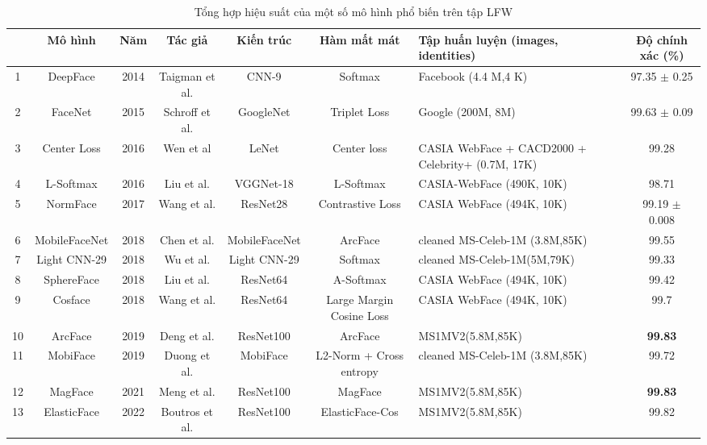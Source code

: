 \begin{table}
    \footnotesize
    \centering
    \begin{tabular}{|c|c|c|c|c|c|p{4cm}|c|}
        \hline &\textbf{Mô hình} & \textbf{Năm} & \textbf{Tác giả} & \textbf{Kiến trúc} & \textbf{Hàm mất mát} & \textbf{Tập huấn luyện (images, identities)} & \textbf{Độ chính xác (\%)} \\
        \hline 
        1&DeepFace & 2014 & Taigman et al.\cite{deep_face_Taigman_2014_CVPR}& CNN-9& Softmax & Facebook (4.4 M,4 K) & 97.35 $\pm$ 0.25 \\ 
        2&FaceNet & 2015 & Schroff et al.\cite{39_Schroff_2015_CVPR} & GoogleNet & Triplet Loss & Google (200M, 8M)& 99.63 $\pm$ 0.09\\ 
        3&Center Loss& 2016 & Wen et al\cite{LOSS_Center_10.1007/978-3-319-46478-7_31}& LeNet & Center loss & CASIA WebFace\cite{yi_2014_learning} + CACD2000\cite{chen14cross} + Celebrity+\cite{liu_2015_deep} (0.7M, 17K) & 99.28\\ 
        4&L-Softmax & 2016 & Liu et al.\cite{LOSS_L_liu_2017_largemargin}& VGGNet-18 & L-Softmax& CASIA-WebFace (490K, 10K) &98.71\\ 
        5&NormFace & 2017 & Wang et al.\cite{LOSS_Norm_10.1145/3123266.3123359}& ResNet28 & Contrastive Loss & CASIA WebFace (494K, 10K) & 99.19 $\pm$ 0.008\\ 
        6&MobileFaceNet & 2018 & Chen et al. \cite{16_chen_2018_mobilefacenets} & MobileFaceNet &ArcFace & cleaned MS-Celeb-1M\cite{guo_2016_msceleb1m} (3.8M,85K)\cite{4_Deng_2019_CVPR} & 99.55\\ 
        7&Light CNN-29 &2018 &Wu et al.\cite{40_8353856}&Light CNN-29 & Softmax & cleaned MS-Celeb-1M(5M,79K) & 99.33\\ 
        8&SphereFace & 2018 &Liu et al.\cite{10_Liu_2017_CVPR}& ResNet64 & A-Softmax & CASIA WebFace (494K, 10K)& 99.42\\ 
        9&Cosface & 2018 & Wang et al.\cite{6_Wang_2018_CVPR} & ResNet64 & Large Margin Cosine Loss & CASIA WebFace (494K, 10K)& 99.7\\ 
        10&ArcFace & 2019 & Deng et al.\cite{4_Deng_2019_CVPR} &ResNet100 & ArcFace & MS1MV2(5.8M,85K) & \textbf{99.83}\\ 
        11 & MobiFace & 2019 & Duong et al.\cite{ARC_9185981} & MobiFace & L2-Norm + Cross entropy & cleaned MS-Celeb-1M (3.8M,85K) & 99.72\\
        12&MagFace &2021 &Meng et al. \cite{23_meng_2021_magface} & ResNet100 & MagFace & MS1MV2(5.8M,85K) & \textbf{99.83}\\ 
        13&ElasticFace &2022 &Boutros et al.\cite{5_Boutros_2022_CVPR}& ResNet100 & ElasticFace-Cos & MS1MV2(5.8M,85K) & 99.82\\ 
       \hline
    \end{tabular}
     \caption{Tổng hợp hiệu suất của một số mô hình phổ biến trên tập LFW }
    \label{tab:dcnn_table}
\end{table}
